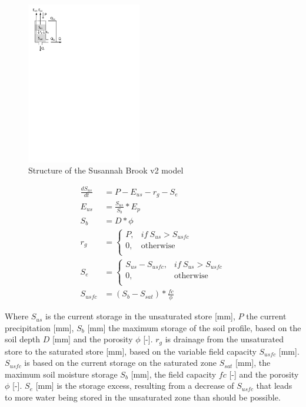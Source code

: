 { 																	%
\begin{figure}
\includegraphics[trim=1cm 21cm 14cm 0.8cm,width=5cm,keepaspectratio]{./files/10_schematic.pdf}
\caption{Structure of the Susannah Brook v2 model} \label{fig:10_schematic}
\end{figure}

\begin{align}
	\frac{dS_{us}}{dt} &= P-E_{us}-r_g -S_e\\
	E_{us} &= \frac{S_{us}}{S_b}*E_p\\
	S_b &= D*\phi\\
	r_g &= 
	\begin{cases}
		P, & if~S_{us} > S_{usfc}\\
		0, & \text{otherwise} \\
	\end{cases} \\
	S_e &= \begin{cases}
			S_{us} - S_{usfc}, & if~S_{us} > S_{usfc}\\
			0, & \text{otherwise} \\
			\end{cases}\\
	S_{usfc} &= (S_b - S_{sat})*\frac{fc}{\phi} 
\end{align}

Where $S_{us}$ is the current storage in the unsaturated store [mm], $P$ the current precipitation [mm], $S_b$ [mm] the maximum storage of the soil profile, based on the soil depth $D$ [mm] and the porosity $\phi$ [-]. $r_g$ is drainage from the unsaturated store to the saturated store [mm], based on the variable field capacity $S_{usfc}$ [mm]. $S_{usfc}$ is based on the current storage on the saturated zone $S_{sat}$ [mm], the maximum soil moisture storage $S_b$ [mm], the field capacity $fc$ [-] and the porosity $\phi$ [-]. $S_e$ [mm] is the storage excess, resulting from a decrease of $S_{usfc}$ that leads to more water being stored in the unsaturated zone than should be possible.

} %

